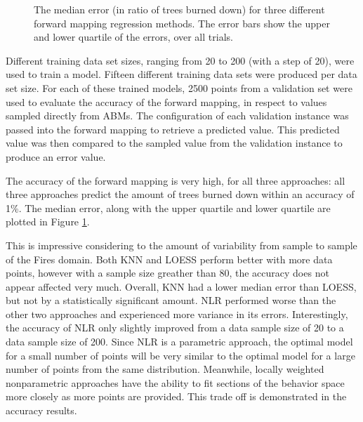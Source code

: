 \begin{figure}[ht]
\caption{The median error (in ratio of trees burned down) for three different forward mapping regression methods.
The error bars show the upper and lower quartile of the errors, over all trials.}
\label{fig:fmacc}
\end{figure}

Different training data set sizes, ranging from 20 to 200 (with a step of 20), were used to train a model.
Fifteen different training data sets were produced per data set size.
For each of these trained models, 2500 points from a validation set were used to evaluate the accuracy of the forward mapping, in respect to values sampled directly from ABMs.
The configuration of each validation instance was passed into the forward mapping to retrieve a predicted value.
This predicted value was then compared to the sampled value from the validation instance to produce an error value.

The accuracy of the forward mapping is very high, for all three approaches: all three approaches predict the amount of trees burned down within an accuracy of 1\%.
The median error, along with the upper quartile and lower quartile are plotted in Figure \ref{fig:fmacc}.

This is impressive considering to the amount of variability from sample to sample of the Fires domain.
Both KNN and LOESS perform better with more data points, however with a sample size greather than 80, the accuracy does not appear affected very much.
Overall, KNN had a lower median error than LOESS, but not by a statistically significant amount.
NLR performed worse than the other two approaches and experienced more variance in its errors.
Interestingly, the accuracy of NLR only slightly improved from a data sample size of 20 to a data sample size of 200.
Since NLR is a parametric approach, the optimal model for a small number of points will be very similar to the optimal model for a large number of points from the same distribution.
Meanwhile, locally weighted nonparametric approaches have the ability to fit sections of the behavior space more closely as more points are provided.
This trade off is demonstrated in the accuracy results.


